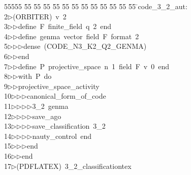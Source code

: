 %
%
\begin{tabbing}
55555 \= 55 \= 55 \= 55 \= 55 \= 55 \= 55 \= 55 \= 55 \= 55 \= 55 \= 55 \= 55 \= \>code\_3\_2\_aut:\\[0pt]
2\>$\triangleright$\>(ORBITER)\ v\ 2\ \\[0pt]
3\>$\triangleright$\>$\triangleright$\>define\ F\ finite\_field\ q\ 2\ end\ \\[0pt]
4\>$\triangleright$\>$\triangleright$\>define\ genma\ vector\ field\ F\ format\ 2\ \\[0pt]
5\>$\triangleright$\>$\triangleright$\>$\triangleright$\>dense\ (CODE\_N3\_K2\_Q2\_GENMA)\ \\[0pt]
6\>$\triangleright$\>$\triangleright$\>end\ \\[0pt]
7\>$\triangleright$\>$\triangleright$\>define\ P\ projective\_space\ n\ 1\ field\ F\ v\ 0\ end\ \\[0pt]
8\>$\triangleright$\>$\triangleright$\>with\ P\ do\ \\[0pt]
9\>$\triangleright$\>$\triangleright$\>projective\_space\_activity\ \\[0pt]
10\>$\triangleright$\>$\triangleright$\>$\triangleright$\>canonical\_form\_of\_code\ \\[0pt]
11\>$\triangleright$\>$\triangleright$\>$\triangleright$\>$\triangleright$\>3\_2\ genma\ \\[0pt]
12\>$\triangleright$\>$\triangleright$\>$\triangleright$\>$\triangleright$\>save\_ago\ \\[0pt]
13\>$\triangleright$\>$\triangleright$\>$\triangleright$\>$\triangleright$\>save\_classification\ 3\_2\ \\[0pt]
14\>$\triangleright$\>$\triangleright$\>$\triangleright$\>$\triangleright$\>nauty\_control\ end\ \\[0pt]
15\>$\triangleright$\>$\triangleright$\>$\triangleright$\>end\ \\[0pt]
16\>$\triangleright$\>$\triangleright$\>end\\[0pt]
17\>$\triangleright$\>(PDFLATEX)\ 3\_2\_classificationtex\\[0pt]

\end{tabbing}

